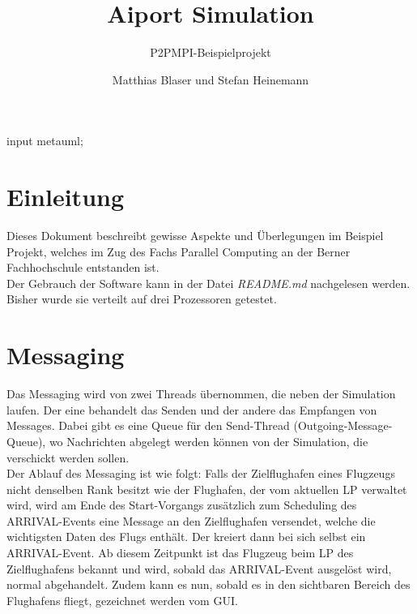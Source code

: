 \documentclass[oneside,DIV12,BCOR0.5cm,bibliography=totoc]{template}
\begin{document}
\begin{empfile}
\begin{empcmds}
input metauml;
\end{empcmds}


\title{Aiport Simulation}
\subtitle{P2PMPI-Beispielprojekt}

\author{Matthias Blaser und Stefan Heinemann }

\maketitle


\section{Einleitung}

Dieses Dokument beschreibt gewisse Aspekte und Überlegungen im Beispiel
Projekt, welches im Zug des Fachs Parallel Computing an der Berner
Fachhochschule entstanden ist.\\

Der Gebrauch der Software kann in der Datei \emph{README.md} nachgelesen
werden. Bisher wurde sie verteilt auf drei Prozessoren getestet.

\section{Messaging}

Das Messaging wird von zwei Threads übernommen, die neben der Simulation
laufen. Der eine behandelt das Senden und der andere das Empfangen
von Messages. Dabei gibt es eine Queue für den Send-Thread 
(Outgoing-Message-Queue), wo Nachrichten abgelegt werden können von der
Simulation, die verschickt werden sollen.\\

Der Ablauf des Messaging ist wie folgt: Falls der Zielflughafen eines
Flugzeugs nicht denselben Rank besitzt wie der Flughafen, der vom
aktuellen LP verwaltet wird, wird am Ende des Start-Vorgangs zusätzlich
zum Scheduling des ARRIVAL-Events eine Message an den Zielflughafen
versendet, welche die wichtigsten Daten des Flugs enthält. Der kreiert
dann bei sich selbst ein ARRIVAL-Event. Ab diesem Zeitpunkt ist das
Flugzeug beim LP des Zielflughafens bekannt und wird, sobald das
ARRIVAL-Event ausgelöst wird, normal abgehandelt. Zudem kann es nun,
sobald es in den sichtbaren Bereich des Flughafens fliegt, gezeichnet
werden vom GUI.\\


\end{empfile}
\end{document}
